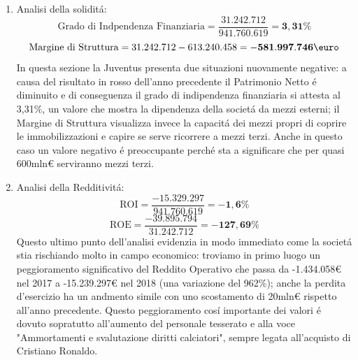\documentclass[
    corpo=12pt,
    oneside,
    evenboxes,
    tipotesi=triennale,
    stile=classica,
    oldstyle,
    autoretitolo,
    greek,
]{toptesi}
\begin{document}
\begin{interlinea}{1.5}
\begin{enumerate}
    \item Analisi della solidit\'a:\newline
        \begin{equation}
            \text{Grado di Indpendenza Finanziaria} = \frac{31.242.712}{941.760.619} = \mathbf{3,31\%}
        \label{eqn: indeb_juve}
        \end{equation}
        \begin{equation}
            \text{Margine di Struttura} = 31.242.712-613.240.458 = \mathbf{-581.997.746\mbox{\euro}}
            \label{eqn: marg_strutt_juve}
        \end{equation}
        In questa sezione la Juventus presenta due situazioni nuovamente negative: a causa del risultato in rosso dell'anno
        precedente il Patrimonio Netto \'e diminuito e di conseguenza il grado di indipendenza finanziaria si attesta al 3,31\%,
        un valore che mostra la dipendenza della societ\'a da mezzi esterni; il Margine di Struttura
        visualizza invece la capacit\'a dei mezzi propri di coprire le immobilizzazioni e capire se serve ricorrere a mezzi terzi. Anche in questo 
        caso un valore negativo \'e preoccupante perch\'e sta a significare che per quasi 600mln€ serviranno mezzi terzi.\newpage
    \item Analisi della Redditivit\'a:\newline
        \begin{equation}
            \text{ROI} = \frac{-15.329.297}{941.760.619} = \mathbf{-1,6\%}
        \label{eqn: roi_juve}
        \end{equation}
        \begin{equation}
            \text{ROE} = \frac{-39.895.794}{31.242.712} = \mathbf{-127,69\%}
        \label{eqn: roe_juve}
        \end{equation}
        Questo ultimo punto dell'analisi evidenzia in modo immediato come la societ\'a stia rischiando molto in campo economico: troviamo in 
        primo luogo un peggioramento significativo del Reddito Operativo che passa da -1.434.058€ nel 2017 a -15.239.297€ nel 2018 (una variazione del 962\%);
        anche la perdita d'esercizio ha un andmento simile con uno scostamento di 20mln€ rispetto all'anno precedente. Questo peggioramento
        cos\'i importante dei valori \'e dovuto sopratutto all'aumento del personale tesserato e alla voce "Ammortamenti e svalutazione diritti calciatori",
        sempre legata all'acquisto di Cristiano Ronaldo.
\end{enumerate}

\end{interlinea}
\end{document}
